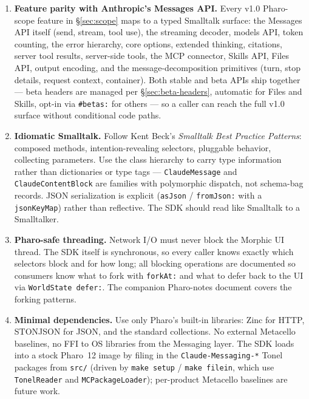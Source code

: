 \documentclass[a4paper,10pt,fleqn]{article}
\newcommand{\sel}[1]{\texttt{\##1}}
\begin{document}
\begin{enumerate}[label=\textbf{G\arabic*}.]
  \item \textbf{Feature parity with Anthropic's Messages API.}  Every
    v1.0 Pharo-scope feature in \S\ref{sec:scope} maps to a typed
    Smalltalk surface: the Messages API itself (send, stream, tool
    use), the streaming decoder, models API, token counting, the error
    hierarchy, core options, extended thinking, citations, server tool
    results, server-side tools, the MCP connector, Skills API, Files
    API, output encoding, and the message-decomposition primitives
    (turn, stop details, request context, container).  Both stable and
    beta APIs ship together --- beta headers are managed per
    \S\ref{sec:beta-headers}, automatic for Files and Skills, opt-in
    via \sel{betas:} for others --- so a caller can reach the full
    v1.0 surface without conditional code paths.
  \item \textbf{Idiomatic Smalltalk.}  Follow Kent Beck's
    \emph{Smalltalk Best Practice Patterns}: composed methods,
    intention-revealing selectors, pluggable behavior, collecting
    parameters.  Use the class hierarchy to carry type information
    rather than dictionaries or type tags --- \texttt{ClaudeMessage}
    and \texttt{ClaudeContentBlock} are families with polymorphic
    dispatch, not schema-bag records.  JSON serialization is explicit
    (\texttt{asJson} / \texttt{fromJson:} with a \texttt{jsonKeyMap})
    rather than reflective.  The SDK should read like Smalltalk to a
    Smalltalker.
  \item \textbf{Pharo-safe threading.}  Network I/O must never block
    the Morphic UI thread.  The SDK itself is synchronous, so every
    caller knows exactly which selectors block and for how long; all
    blocking operations are documented so consumers know what to fork
    with \texttt{forkAt:} and what to defer back to the UI via
    \texttt{WorldState defer:}.  The companion Pharo-notes document
    covers the forking patterns.
  \item \textbf{Minimal dependencies.}  Use only Pharo's built-in
    libraries: Zinc for HTTP, STONJSON for JSON, and the standard
    collections.  No external Metacello baselines, no FFI to OS
    libraries from the Messaging layer.  The SDK loads into a stock
    Pharo~12 image by filing in the \texttt{Claude-Messaging-*} Tonel
    packages from \texttt{src/} (driven by \texttt{make setup} /
    \texttt{make filein}, which use \texttt{TonelReader} and
    \texttt{MCPackageLoader}); per-product Metacello baselines are
    future work.
\end{enumerate}
\end{document}
